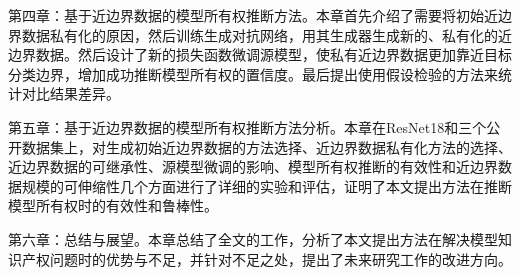 第四章：基于近边界数据的模型所有权推断方法。本章首先介绍了需要将初始近边界数据私有化的原因，然后训练生成对抗网络，用其生成器生成新的、私有化的近边界数据。然后设计了新的损失函数微调源模型，使私有近边界数据更加靠近目标分类边界，增加成功推断模型所有权的置信度。最后提出使用假设检验的方法来统计对比结果差异。

第五章：基于近边界数据的模型所有权推断方法分析。本章在ResNet18和三个公开数据集上，对生成初始近边界数据的方法选择、近边界数据私有化方法的选择、近边界数据的可继承性、源模型微调的影响、模型所有权推断的有效性和近边界数据规模的可伸缩性几个方面进行了详细的实验和评估，证明了本文提出方法在推断模型所有权时的有效性和鲁棒性。

第六章：总结与展望。本章总结了全文的工作，分析了本文提出方法在解决模型知识产权问题时的优势与不足，并针对不足之处，提出了未来研究工作的改进方向。
